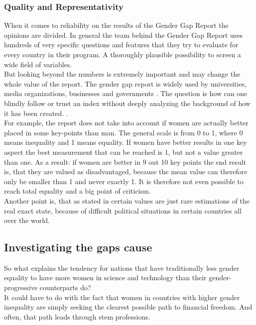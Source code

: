 	\subsubsection{Quality and Representativity}
	When it comes to reliability on the results of the Gender Gap Report the opinions are divided. In general the team behind the Gender Gap Report uses hundreds of very specific questions and features that they try to evaluate for every country in their program. A thoroughly plausible possibility to screen a wide field of variables.\\
	\newline
	But looking beyond the numbers is extremely important and may change the whole value of the report. The gender gap report is widely used by universities, media organizations, businesses and governments \cite{tgender}. The question is how can one blindly follow or trust an index without deeply analyzing the background of how it has been created. \cite{tagainstgender}.\\
	
	For example, the report does not take into account if women are actually better placed in some key-points than man. The general scale is from 0 to 1, where 0 means inequality and 1 means equality. If women have better results in one key aspect the best measurement that can be reached is 1, but not a value greater than one. As a result: if women are better in 9 out 10 key points the end result is, that they are valued as disadvantaged, because the mean value can therefore only be smaller than 1 and never exactly 1. It is therefore not even possible to reach total equality and a big point of criticism. \cite{tgenderPaper}\\
	\newline
	Another point is, that as stated in \cite{tgenderPaper} certain values are just rare estimations of the real exact state, because of difficult political situations in certain countries all over the world.
	
	\subsection{Investigating the gaps cause}
	So what explains the tendency for nations that have traditionally less gender equality to have more women in science and technology than their gender-progressive counterparts do?\\
		
	It could have to do with the fact that women in countries with higher gender inequality are simply seeking the clearest possible path to financial freedom. And often, that path leads through stem professions.
	
